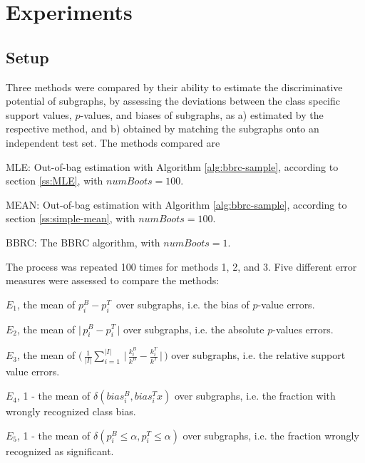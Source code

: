 \documentclass{sig-alternate}
\begin{document}
\section{Experiments}
\label{s:Experiments}

\subsection{Setup} 
\label{ss:Error-estimation} 
Three methods were compared by their ability to estimate the discriminative
potential of subgraphs, by assessing the deviations between the class specific
support values, $p$-values, and biases of subgraphs, as a) estimated by the respective
method, and b) obtained by matching the subgraphs onto an independent test set.
The methods compared are
\begin{enumerate*} 
  \item MLE: Out-of-bag estimation with Algorithm \ref{alg:bbrc-sample}, according
    to section \ref{ss:MLE}, with $numBoots=100$.
  \item MEAN: Out-of-bag estimation with Algorithm \ref{alg:bbrc-sample}, according
    to section \ref{ss:simple-mean}, with $numBoots=100$.
  \item BBRC: The BBRC algorithm, with $numBoots=1$.
\end{enumerate*}

The process was repeated 100 times for methods 1, 2, and 3. Five different
error measures were assessed to compare the methods:
\begin{enumerate*}
  \item $E_1$, the mean of     $ p^B_i -p^T_i \,$                                                                                    over subgraphs, i.e. the bias of $p$-value errors.
  \item $E_2$, the mean of     $ \Big|\,p^B_i -p^T_i \,\Big|$                                                                        over subgraphs, i.e. the absolute $p$-values errors.
  \item $E_3$, the mean of     $ \Big(\,\frac{1}{|I|} \sum_{i=1}^{|I|} \,\Big|\,\frac{k^B_i}{k^B} - \frac{k^T_i}{k^T} \,\Big|\,\Big)$ over subgraphs, i.e. the relative support value errors.
  \item $E_4$, 1 - the mean of $ \delta(bias^B_i, bias^T_ix)$                                                                        over subgraphs, i.e. the fraction with wrongly recognized class bias.
  \item $E_5$, 1 - the mean of $ \delta(p^B_i \le \alpha, p^T_i \le \alpha)$                                                         over subgraphs, i.e. the fraction wrongly recognized as significant.
\end{enumerate*}
\end{document}
